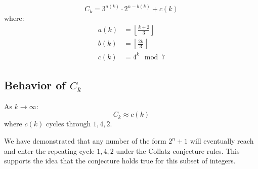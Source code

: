 \[
C_k = 3^{a(k)} \cdot 2^{n - b(k)} + c(k)
\]
where:
\begin{align*}
a(k) &= \left\lfloor \frac{k + 2}{3} \right\rfloor \\
b(k) &= \left\lfloor \frac{2k}{3} \right\rfloor \\
c(k) &= 4^k \mod 7
\end{align*}

\subsection{Behavior of \(C_k\)}
As \(k \to \infty\):
\[
C_k \approx c(k)
\]
where \(c(k)\) cycles through \(1, 4, 2\).

We have demonstrated that any number of the form \(2^n + 1\) will eventually reach and enter the repeating cycle \(1, 4, 2\) under the Collatz conjecture rules. This supports the idea that the conjecture holds true for this subset of integers.